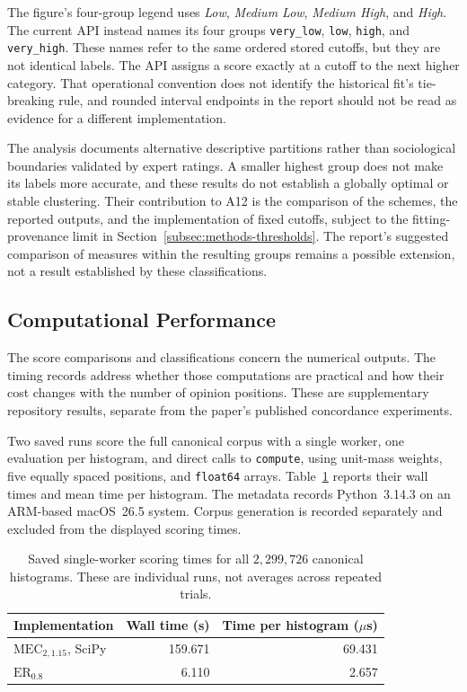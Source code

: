 \documentclass{article}
\theoremstyle{plain}
\theoremstyle{remark}
\begin{document}
The figure's four-group legend uses \emph{Low}, \emph{Medium Low}, \emph{Medium High}, and \emph{High}. The current API instead names its four groups \texttt{very\_low}, \texttt{low}, \texttt{high}, and \texttt{very\_high}. These names refer to the same ordered stored cutoffs, but they are not identical labels. The API assigns a score exactly at a cutoff to the next higher category. That operational convention does not identify the historical fit's tie-breaking rule, and rounded interval endpoints in the report should not be read as evidence for a different implementation.

The analysis documents alternative descriptive partitions rather than sociological boundaries validated by expert ratings. A smaller highest group does not make its labels more accurate, and these results do not establish a globally optimal or stable clustering. Their contribution to A12 is the comparison of the schemes, the reported outputs, and the implementation of fixed cutoffs, subject to the fitting-provenance limit in Section~\ref{subsec:methods-thresholds}. The report's suggested comparison of measures within the resulting groups remains a possible extension, not a result established by these classifications.

\subsection{Computational Performance}\label{subsec:results-performance}

The score comparisons and classifications concern the numerical outputs. The timing records address whether those computations are practical and how their cost changes with the number of opinion positions. These are supplementary repository results, separate from the paper's published concordance experiments.

Two saved runs score the full canonical corpus with a single worker, one evaluation per histogram, and direct calls to \texttt{compute}, using unit-mass weights, five equally spaced positions, and \texttt{float64} arrays. Table~\ref{tab:results-corpus-timing} reports their wall times and mean time per histogram. The metadata records Python~3.14.3 on an ARM-based macOS~26.5 system. Corpus generation is recorded separately and excluded from the displayed scoring times.

\begin{table}[htbp]
\centering
\caption{Saved single-worker scoring times for all $2{,}299{,}726$ canonical histograms. These are individual runs, not averages across repeated trials.}
\label{tab:results-corpus-timing}
\small
\begin{tabular}{@{}lrr@{}}
\toprule
Implementation & Wall time (s) & Time per histogram ($\mu$s)\\
\midrule
$\mathrm{MEC}_{2,1.15}$, SciPy & 159.671 & 69.431\\
$\mathrm{ER}_{0.8}$ & 6.110 & 2.657\\
\bottomrule
\end{tabular}
\end{table}
\end{document}
